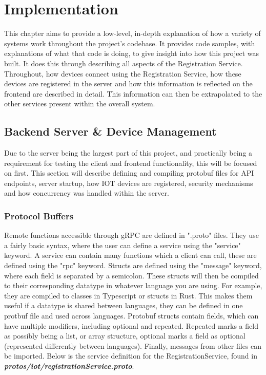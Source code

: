 \chapter{Implementation} \label{cha:implementation}
This chapter aims to provide a low-level, in-depth explanation of how a variety of systems work throughout the project's codebase. It provides code samples, with explanations of what that code is doing, to give insight into how this project was built. It does this through describing all aspects of the Registration Service. Throughout, how devices connect using the Registration Service, how these devices are registered in the server and how this information is reflected on the frontend are described in detail. This information can then be extrapolated to the other services present within the overall system.

\section{Backend Server \& Device Management} \label{sec:chapimpl:server}
Due to the server being the largest part of this project, and practically being a requirement for testing the client and frontend functionality, this will be focused on first. This section will describe defining and compiling protobuf files for API endpoints, server startup, how IOT devices are registered, security mechanisms and how concurrency was handled within the server. 

\subsection{Protocol Buffers} \label{sec:chapimpl:server:protoBufs}
Remote functions accessible through gRPC are defined in ".proto" files. They use a fairly basic syntax, where the user can define a service using the "service" keyword. A service can contain many functions which a client can call, these are defined using the "rpc" keyword. Structs are defined using the "message" keyword, where each field is separated by a semicolon. These structs will then be compiled to their corresponding datatype in whatever language you are using. For example, they are compiled to classes in Typescript or structs in Rust. This makes them useful if a datatype is shared between languages,  they can be defined in one protbuf file and used across languages. Protobuf structs contain fields, which can have multiple modifiers, including optional and repeated. Repeated marks a field as possibly being a list, or array structure, optional marks a field as optional (represented differently between languages). Finally, messages from other files can be imported. Below is the service definition for the RegistrationService, found in \textbf{\textit{protos/iot/registrationService.proto}}:


